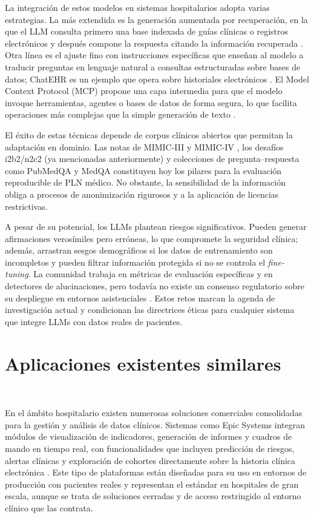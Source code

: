 La integración de estos modelos en sistemas hospitalarios adopta varias estrategias. La más extendida es la generación aumentada por recuperación, en la que el LLM consulta primero una base indexada de guías clínicas o registros electrónicos y después compone la respuesta citando la información recuperada \cite{RAGSurvey2023}. Otra línea es el ajuste fino con instrucciones específicas que enseñan al modelo a traducir preguntas en lenguaje natural a consultas estructuradas sobre bases de datos; ChatEHR es un ejemplo que opera sobre historiales electrónicos \cite{Stanford2025_ChatEHR}. El Model Context Protocol (MCP) propone una capa intermedia para que el modelo invoque herramientas, agentes o bases de datos de forma segura, lo que facilita operaciones más complejas que la simple generación de texto \cite{AnthropicMCP2024}.

El éxito de estas técnicas depende de corpus clínicos abiertos que permitan la adaptación en dominio. Las notas de MIMIC-III y MIMIC-IV \cite{Johnson2023_MIMICIVNote}, los desafíos i2b2/n2c2 \cite{n2c2} (ya mencionadas anteriormente) y colecciones de pregunta–respuesta como PubMedQA \cite{Jin2019_PubMedQA} y MedQA \cite{Jin2020_MedQA} constituyen hoy los pilares para la evaluación reproducible de PLN médico. No obstante, la sensibilidad de la información obliga a procesos de anonimización rigurosos y a la aplicación de licencias restrictivas.

A pesar de su potencial, los LLMs plantean riesgos significativos. Pueden generar afirmaciones verosímiles pero erróneas, lo que compromete la seguridad clínica; además, arrastran sesgos demográficos si los datos de entrenamiento son incompletos y pueden filtrar información protegida si no se controla el \textit{fine-tuning}. La comunidad trabaja en métricas de evaluación específicas y en detectores de alucinaciones, pero todavía no existe un consenso regulatorio sobre su despliegue en entornos asistenciales \cite{Bommasani2022_FoundationModels}. Estos retos marcan la agenda de investigación actual y condicionan las directrices éticas para cualquier sistema que integre LLMs con datos reales de pacientes.



\section{Aplicaciones existentes similares}\

En el ámbito hospitalario existen numerosas soluciones comerciales consolidadas para la gestión y análisis de datos clínicos. Sistemas como Epic Systems integran módulos de visualización de indicadores, generación de informes y cuadros de mando en tiempo real, con funcionalidades que incluyen predicción de riesgos, alertas clínicas y exploración de cohortes directamente sobre la historia clínica electrónica \cite{Epic}. Este tipo de plataformas están diseñadas para su uso en entornos de producción con pacientes reales y representan el estándar en hospitales de gran escala, aunque se trata de soluciones cerradas y de acceso restringido al entorno clínico que las contrata.

